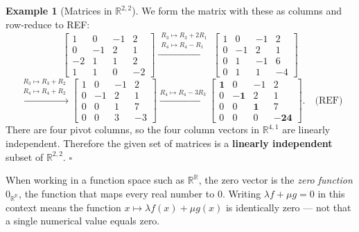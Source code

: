 \documentclass[11pt, a4paper, notitlepage]{report}
\theoremstyle{definition}
\newtheorem{example}[theorem]{Example}
\theoremstyle{remark}
\begin{document}
\begin{example}[Matrices in $\mathbb{R}^{2,2}$]
We form the matrix with these as columns and row-reduce to REF:
\[
  \begin{bmatrix}1&0&-1&2\\0&-1&2&1\\-2&1&1&2\\1&1&0&-2\end{bmatrix}
  \xrightarrow{\substack{R_3\mapsto R_3+2R_1\\R_4\mapsto R_4-R_1}}
  \begin{bmatrix}1&0&-1&2\\0&-1&2&1\\0&1&-1&6\\0&1&1&-4\end{bmatrix}
\]
\[
  \xrightarrow{\substack{R_3\mapsto R_3+R_2\\R_4\mapsto R_4+R_2}}
  \begin{bmatrix}1&0&-1&2\\0&-1&2&1\\0&0&1&7\\0&0&3&-3\end{bmatrix}
  \xrightarrow{R_4\mapsto R_4-3R_3}
  \begin{bmatrix}\mathbf{1}&0&-1&2\\0&\mathbf{-1}&2&1\\0&0&\mathbf{1}&7\\0&0&0&\mathbf{-24}\end{bmatrix}.
  \quad\text{(REF)}
\]
There are four pivot columns, so the four column vectors in $\mathbb{R}^{4,1}$ are linearly independent. Therefore the given set of matrices is a \textbf{linearly independent} subset of $\mathbb{R}^{2,2}$. $\square$
\end{example}

\begin{warning}[title={Warning: The Zero Function vs.\ the Number Zero}]
When working in a function space such as $\mathbb{R}^\mathbb{R}$, the zero vector is the \emph{zero function} $0_{\mathbb{R}^\mathbb{R}}$, the function that maps every real number to $0$. Writing $\lambda f + \mu g = 0$ in this context means the function $x \mapsto \lambda f(x) + \mu g(x)$ is identically zero — not that a single numerical value equals zero.
\end{warning}
\end{document}
